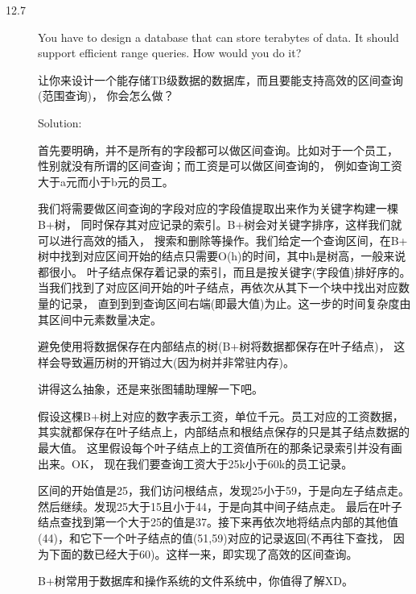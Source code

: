 \begin{description}
\item[12.7] You have to design a database that can store terabytes of data. It should support efficient range queries. How would you do it?

让你来设计一个能存储TB级数据的数据库，而且要能支持高效的区间查询(范围查询)， 你会怎么做？

Solution: 

首先要明确，并不是所有的字段都可以做区间查询。比如对于一个员工， 性别就没有所谓的区间查询；而工资是可以做区间查询的， 例如查询工资大于a元而小于b元的员工。

我们将需要做区间查询的字段对应的字段值提取出来作为关键字构建一棵B+树， 同时保存其对应记录的索引。B+树会对关键字排序，这样我们就可以进行高效的插入， 搜索和删除等操作。我们给定一个查询区间，在B+ 树中找到对应区间开始的结点只需要O(h)的时间，其中h是树高，一般来说都很小。 叶子结点保存着记录的索引，而且是按关键字(字段值)排好序的。 当我们找到了对应区间开始的叶子结点，再依次从其下一个块中找出对应数量的记录， 直到到到查询区间右端(即最大值)为止。这一步的时间复杂度由其区间中元素数量决定。

避免使用将数据保存在内部结点的树(B+树将数据都保存在叶子结点)， 这样会导致遍历树的开销过大(因为树并非常驻内存)。

讲得这么抽象，还是来张图辅助理解一下吧。

假设这棵B+树上对应的数字表示工资，单位千元。员工对应的工资数据， 其实就都保存在叶子结点上，内部结点和根结点保存的只是其子结点数据的最大值。 这里假设每个叶子结点上的工资值所在的那条记录索引并没有画出来。OK， 现在我们要查询工资大于25k小于60k的员工记录。

区间的开始值是25，我们访问根结点，发现25小于59，于是向左子结点走。 然后继续。发现25大于15且小于44，于是向其中间子结点走。 最后在叶子结点查找到第一个大于25的值是37。接下来再依次地将结点内部的其他值 (44)，和它下一个叶子结点的值(51,59)对应的记录返回(不再往下查找， 因为下面的数已经大于60)。这样一来，即实现了高效的区间查询。

B+树常用于数据库和操作系统的文件系统中，你值得了解XD。

\end{description}
